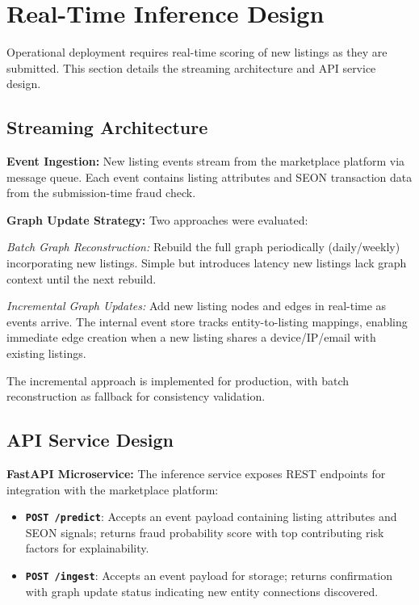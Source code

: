 \section{Real-Time Inference Design}
\label{sec:3_11}

Operational deployment requires real-time scoring of new listings as they are submitted. This section details the streaming architecture and API service design.

\subsection{Streaming Architecture}

\textbf{Event Ingestion:} New listing events stream from the marketplace platform via message queue. Each event contains listing attributes and SEON transaction data from the submission-time fraud check.

\textbf{Graph Update Strategy:} Two approaches were evaluated:

\textit{Batch Graph Reconstruction:} Rebuild the full graph periodically (daily/weekly) incorporating new listings. Simple but introduces latency new listings lack graph context until the next rebuild.

\textit{Incremental Graph Updates:} Add new listing nodes and edges in real-time as events arrive. The internal event store tracks entity-to-listing mappings, enabling immediate edge creation when a new listing shares a device/IP/email with existing listings.

The incremental approach is implemented for production, with batch reconstruction as fallback for consistency validation.

\subsection{API Service Design}

\textbf{FastAPI Microservice:} The inference service exposes REST endpoints for integration with the marketplace platform:

\begin{itemize}
    \item \textbf{\texttt{POST /predict}}: Accepts an event payload containing listing attributes and SEON signals; returns fraud probability score with top contributing risk factors for explainability.
    \item \textbf{\texttt{POST /ingest}}: Accepts an event payload for storage; returns confirmation with graph update status indicating new entity connections discovered.
\end{itemize}

